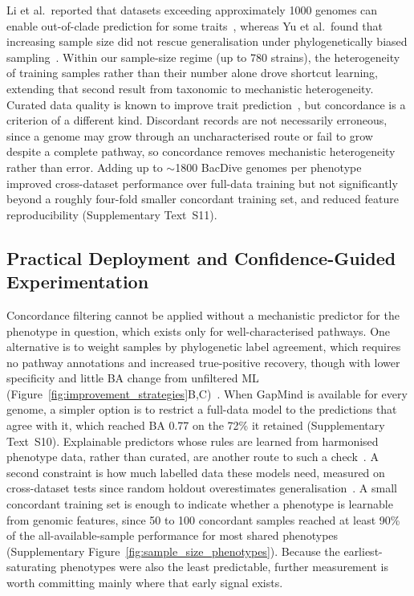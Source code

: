 Li et al.\ reported that datasets exceeding approximately 1000 genomes can enable out-of-clade prediction for some traits~\cite{Li2023-up}, whereas Yu et al.\ found that increasing sample size did not rescue generalisation under phylogenetically biased sampling~\cite{Yu2025BiasedSampling}.
Within our sample-size regime (up to 780 strains), the heterogeneity of training samples rather than their number alone drove shortcut learning, extending that second result from taxonomic to mechanistic heterogeneity.
Curated data quality is known to improve trait prediction~\cite{Koblitz2025Phenotype}, but concordance is a criterion of a different kind.
Discordant records are not necessarily erroneous, since a genome may grow through an uncharacterised route or fail to grow despite a complete pathway, so concordance removes mechanistic heterogeneity rather than error.
Adding up to $\sim$1800 BacDive genomes per phenotype~\cite{Schober2025BacDive} improved cross-dataset performance over full-data training but not significantly beyond a roughly four-fold smaller concordant training set, and reduced feature reproducibility (Supplementary Text~S11).


\subsection*{Practical Deployment and Confidence-Guided Experimentation}

Concordance filtering cannot be applied without a mechanistic predictor for the phenotype in question, which exists only for well-characterised pathways.
One alternative is to weight samples by phylogenetic label agreement, which requires no pathway annotations and increased true-positive recovery, though with lower specificity and little BA change from unfiltered ML (Figure~\ref{fig:improvement_strategies}B,C)~\cite{Northcutt2021Confident,Bernhardt2022LabelCleaning}.
When GapMind is available for every genome, a simpler option is to restrict a full-data model to the predictions that agree with it, which reached BA 0.77 on the 72\% it retained (Supplementary Text~S10).
Explainable predictors whose rules are learned from harmonised phenotype data, rather than curated, are another route to such a check~\cite{Masa2025MediaPrediction}.
A second constraint is how much labelled data these models need, measured on cross-dataset tests since random holdout overestimates generalisation~\cite{Roberts2017CrossValidation}.
A small concordant training set is enough to indicate whether a phenotype is learnable from genomic features, since 50 to 100 concordant samples reached at least 90\% of the all-available-sample performance for most shared phenotypes (Supplementary Figure~\ref{fig:sample_size_phenotypes}).
Because the earliest-saturating phenotypes were also the least predictable, further measurement is worth committing mainly where that early signal exists.

